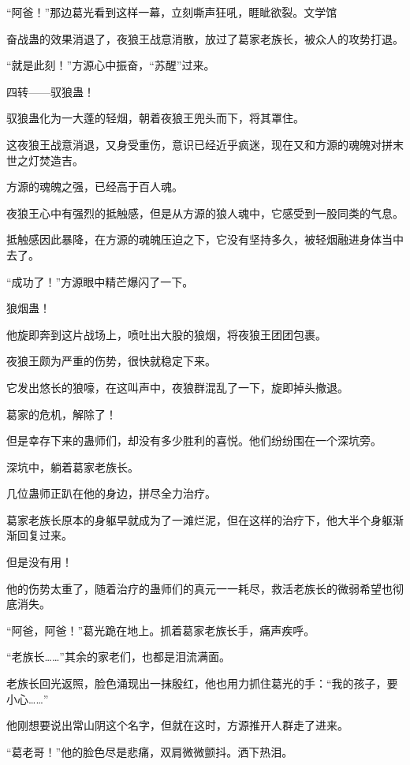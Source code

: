 
\begin{this_body}

“阿爸！”那边葛光看到这样一幕，立刻嘶声狂吼，睚眦欲裂。文学馆

奋战蛊的效果消退了，夜狼王战意消散，放过了葛家老族长，被众人的攻势打退。

“就是此刻！”方源心中振奋，“苏醒”过来。

四转——驭狼蛊！

驭狼蛊化为一大蓬的轻烟，朝着夜狼王兜头而下，将其罩住。

这夜狼王战意消退，又身受重伤，意识已经近乎疯迷，现在又和方源的魂魄对拼末世之灯焚造吉。

方源的魂魄之强，已经高于百人魂。

夜狼王心中有强烈的抵触感，但是从方源的狼人魂中，它感受到一股同类的气息。

抵触感因此暴降，在方源的魂魄压迫之下，它没有坚持多久，被轻烟融进身体当中去了。

“成功了！”方源眼中精芒爆闪了一下。

狼烟蛊！

他旋即奔到这片战场上，喷吐出大股的狼烟，将夜狼王团团包裹。

夜狼王颇为严重的伤势，很快就稳定下来。

它发出悠长的狼嚎，在这叫声中，夜狼群混乱了一下，旋即掉头撤退。

葛家的危机，解除了！

但是幸存下来的蛊师们，却没有多少胜利的喜悦。他们纷纷围在一个深坑旁。

深坑中，躺着葛家老族长。

几位蛊师正趴在他的身边，拼尽全力治疗。

葛家老族长原本的身躯早就成为了一滩烂泥，但在这样的治疗下，他大半个身躯渐渐回复过来。

但是没有用！

他的伤势太重了，随着治疗的蛊师们的真元一一耗尽，救活老族长的微弱希望也彻底消失。

“阿爸，阿爸！”葛光跪在地上。抓着葛家老族长手，痛声疾呼。

“老族长……”其余的家老们，也都是泪流满面。

老族长回光返照，脸色涌现出一抹殷红，他也用力抓住葛光的手：“我的孩子，要小心……”

他刚想要说出常山阴这个名字，但就在这时，方源推开人群走了进来。

“葛老哥！”他的脸色尽是悲痛，双肩微微颤抖。洒下热泪。


\end{this_body}

